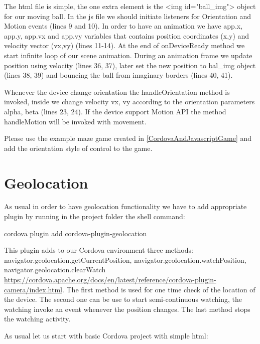 \begin{explain}
The html file is simple, the one extra element is the <img id="ball\_img"> object for our moving ball. In the js file we should initiate listeners for Orientation and Motion events (lines 9 and 10). In order to have an animation we have app.x, app.y, app.vx and app.vy variables that contains position coordinates (x,y) and velocity vector (vx,vy) (lines 11-14). At the end of onDeviceReady method we start infinite loop of our scene animation. During an animation frame we update position using velocity (lines 36, 37), later set the new position to bal\_img object (lines 38, 39) and bouncing the ball from imaginary borders (lines 40, 41).

Whenever the device change orientation the handleOrientation method is invoked, inside we change velocity vx, vy according to the orientation parameters alpha, beta (lines 23, 24). If the device support Motion API the method handleMotion will be invoked with movement.
\end{explain}

\begin{extercises}
Please use the example maze game created in \ref{CordovaAndJavascriptGame} and add the orientation style of control to the game.
\end{extercises}

\section{Geolocation}

As usual in order to have geolocation functionality we have to add appropriate plugin by running in the project folder the shell command:

\begin{shell}
cordova plugin add cordova-plugin-geolocation
\end{shell}

This plugin adds to our Cordova environment three methods: navigator.geolocation.getCurrentPosition, navigator.geolocation.watchPosition, navigator.geolocation.clearWatch \url{https://cordova.apache.org/docs/en/latest/reference/cordova-plugin-camera/index.html}. The first method is used for one time check of the location of the device. The second one can be use to start semi-continuous watching, the watching invoke an event whenever the position changes. The last method stops the watching activity.

As usual let us start with basic Cordova project with simple html:

